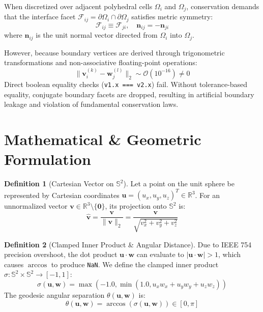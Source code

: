 \documentclass[10pt,twocolumn,letterpaper]{article}
\theoremstyle{definition}
\newtheorem{definition}{Definition}
\begin{document}
When discretized over adjacent polyhedral cells $\Omega_i$ and $\Omega_j$, conservation demands that the interface facet $\mathcal{F}_{ij} = \partial \Omega_i \cap \partial \Omega_j$ satisfies metric symmetry:
\begin{equation}
\mathcal{F}_{ij} \equiv \mathcal{F}_{ji}, \quad \mathbf{n}_{ij} = -\mathbf{n}_{ji}
\end{equation}
where $\mathbf{n}_{ij}$ is the unit normal vector directed from $\Omega_i$ into $\Omega_j$.

However, because boundary vertices are derived through trigonometric transformations and non-associative floating-point operations:
\begin{equation}
\|\mathbf{v}_i^{(k)} - \mathbf{w}_j^{(l)}\|_2 \sim \mathcal{O}(10^{-16}) \ne 0
\end{equation}
Direct boolean equality checks (\texttt{v1.x === v2.x}) fail. Without tolerance-based equality, conjugate boundary facets are dropped, resulting in artificial boundary leakage and violation of fundamental conservation laws.

\section{Mathematical \& Geometric Formulation}

\begin{definition}[Cartesian Vector on $\mathbb{S}^2$]
Let a point on the unit sphere be represented by Cartesian coordinates $\mathbf{u} = (u_x, u_y, u_z)^T \in \mathbb{R}^3$. For an unnormalized vector $\mathbf{v} \in \mathbb{R}^3 \setminus \{\mathbf{0}\}$, its projection onto $\mathbb{S}^2$ is:
\begin{equation}
\hat{\mathbf{v}} = \frac{\mathbf{v}}{\|\mathbf{v}\|_2} = \frac{\mathbf{v}}{\sqrt{v_x^2 + v_y^2 + v_z^2}}
\end{equation}
\end{definition}

\begin{definition}[Clamped Inner Product \& Angular Distance]
Due to IEEE 754 precision overshoot, the dot product $\mathbf{u} \cdot \mathbf{w}$ can evaluate to $| \mathbf{u} \cdot \mathbf{w} | > 1$, which causes $\arccos$ to produce \texttt{NaN}. We define the clamped inner product $\sigma: \mathbb{S}^2 \times \mathbb{S}^2 \to [-1, 1]$:
\begin{equation}
\sigma(\mathbf{u}, \mathbf{w}) = \max\left(-1.0, \min\left(1.0, u_x w_x + u_y w_y + u_z w_z\right)\right)
\end{equation}
The geodesic angular separation $\theta(\mathbf{u}, \mathbf{w})$ is:
\begin{equation}
\theta(\mathbf{u}, \mathbf{w}) = \arccos(\sigma(\mathbf{u}, \mathbf{w})) \in [0, \pi]
\end{equation}
\end{definition}
\end{document}
